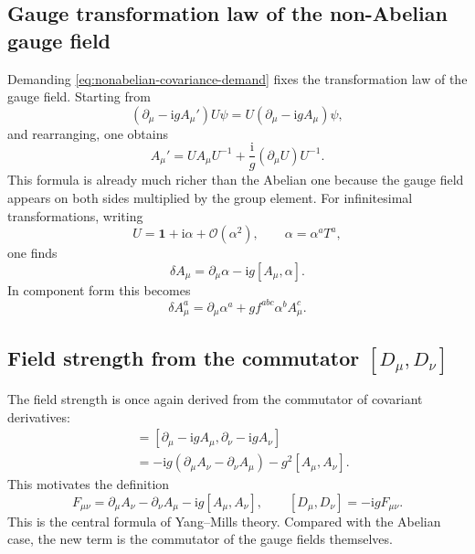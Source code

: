 \documentclass[11pt,a4paper]{article}
\newcommand{\ii}{\mathrm{i}}
\newcommand{\p}{\partial}
\newcommand{\comm}[2]{\left[#1,#2\right]}
\newcommand{\mc}[1]{\mathcal{#1}}
\begin{document}
\subsection{Gauge transformation law of the non-Abelian gauge field}

Demanding \eqref{eq:nonabelian-covariance-demand} fixes the transformation law of the gauge field. Starting from
\[
(\p_\mu-\ii gA_\mu')U\psi = U(\p_\mu-\ii gA_\mu)\psi,
\]
and rearranging, one obtains
\begin{equation}
A_\mu' = U A_\mu U^{-1} + \frac{\ii}{g}(\p_\mu U)U^{-1}.
\label{eq:nonabelian-gauge-transform-expanded}
\end{equation}
This formula is already much richer than the Abelian one because the gauge field appears on both sides multiplied by the group element. For infinitesimal transformations, writing
\[
U=\mathbf{1}+\ii\alpha+\mc{O}(\alpha^2),
\qquad \alpha=\alpha^aT^a,
\]
one finds
\begin{equation}
\delta A_\mu = \p_\mu\alpha - \ii g\comm{A_\mu}{\alpha}.
\label{eq:nonabelian-gauge-variation-expanded}
\end{equation}
In component form this becomes
\begin{equation}
\delta A_\mu^a = \p_\mu\alpha^a + g f^{abc}\alpha^b A_\mu^c.
\label{eq:nonabelian-gauge-variation-components}
\end{equation}



\subsection{Field strength from the commutator \texorpdfstring{$[D_\mu,D_\nu]$}{[Dmu,Dnu]}}

The field strength is once again derived from the commutator of covariant derivatives:
\begin{align}
[D_\mu,D_\nu]
&=
[\p_\mu-\ii gA_\mu,\p_\nu-\ii gA_\nu]
\nonumber\\
&=
-\ii g(\p_\mu A_\nu-\p_\nu A_\mu)-g^2\comm{A_\mu}{A_\nu}.
\end{align}
This motivates the definition
\begin{equation}
F_{\mu\nu}=\p_\mu A_\nu-\p_\nu A_\mu-\ii g\comm{A_\mu}{A_\nu},
\qquad
[D_\mu,D_\nu]=-\ii gF_{\mu\nu}.
\label{eq:nonabelian-field-strength-expanded}
\end{equation}
This is the central formula of Yang--Mills theory. Compared with the Abelian case, the new term is the commutator of the gauge fields themselves.
\end{document}
